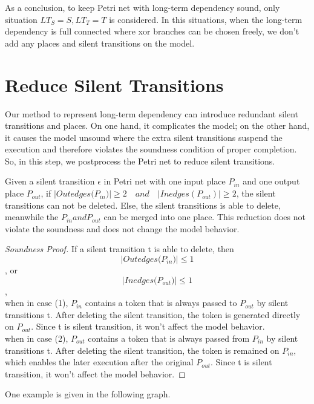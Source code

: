 As a conclusion, to keep Petri net with long-term dependency sound, only situation $ LT_S = S, LT_T=T$ is considered. In this situations, when the long-term dependency is full connected where xor branches can be chosen freely, we don't add any places and silent transitions on the model. 
\section{Reduce Silent Transitions}
Our method to represent long-term dependency  can introduce redundant silent transitions and places. On one hand, it complicates the model; on the other hand, it causes the model unsound where the extra silent transitions suspend the execution and therefore violates the soundness condition of proper completion. So, in this step, we postprocess the Petri net to reduce silent transitions.
\begin{proposition}
	Given a silent transition $\epsilon$ in Petri net with one input place $P_{in}$ and one output place $P_{out}$, if $\vert Outedges({P_{in}) }\vert \geq 2 \quad and \quad \vert Inedges(P_{out}) \vert \geq 2 $, the silent transitions can not be deleted. Else, the silent transitions is able to delete, meanwhile the $P_{in} and P_{out}$ can be merged into one place. This reduction does not violate the soundness and does not change the model behavior.
\end{proposition}
\begin{proof}[Soundness Proof]
	If a silent transition t is able to delete, then
	\[\vert Outedges({P_{in}) }\vert \leq 1	\] , or
	\[\vert Inedges({P_{out}) }\vert \leq 1	\], \\
	when in case (1), $P_{in}$ contains a token that is always passed to $P_{out}$ by silent transitions t. After deleting the silent transition, the token is generated directly on $P_{out}$. Since t is silent transition, it won't affect the model behavior. \\ 
	when in case (2), $P_{out}$ contains a token that is always passed from $P_{in}$ by silent transitions t. After deleting the silent transition, the token is remained on $P_{in}$, which enables the later execution after the original $P_{out}$. Since t is silent transition, it won't affect the model behavior. 
\end{proof}
One example is given in the following graph. 
